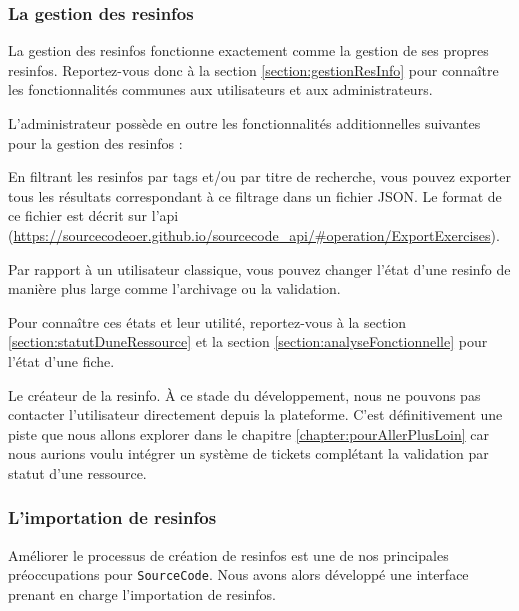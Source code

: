 \subsubsection{La gestion des \glspl{resinfo}}
\label{section:resInfoAdmin}

La gestion des \glspl{resinfo} fonctionne exactement comme la gestion de ses propres \glspl{resinfo}. Reportez-vous donc à la section \ref{section:gestionResInfo} pour connaître les fonctionnalités communes aux utilisateurs et aux administrateurs.

L'administrateur possède en outre les fonctionnalités additionnelles suivantes pour la gestion des \glspl{resinfo} :

 
En filtrant les \glspl{resinfo} par \glspl{tag} et/ou par titre de recherche, vous pouvez exporter tous les résultats correspondant à ce filtrage dans un fichier JSON. Le format de ce fichier est décrit sur l'api (\url{https://sourcecodeoer.github.io/sourcecode_api/#operation/ExportExercises}).


Par rapport à un utilisateur classique, vous pouvez changer l'état d'une \gls{resinfo} de manière plus large comme l'archivage ou la validation.

Pour connaître ces états et leur utilité, reportez-vous à la section \ref{section:statutDuneRessource} et la section \ref{section:analyseFonctionnelle} pour l'état d'une \gls{fiche}.


Le créateur de la \gls{resinfo}. À ce stade du développement, nous ne pouvons pas contacter l'utilisateur directement depuis la plateforme. C'est définitivement une piste que nous allons explorer dans le chapitre \ref{chapter:pourAllerPlusLoin} car nous aurions voulu intégrer un système de tickets complétant la validation par statut d'une ressource.\\

\subsubsection{L'importation de \glspl{resinfo}}

Améliorer le processus de création de \glspl{resinfo} est une de nos principales préoccupations pour \texttt{SourceCode}. Nous avons alors développé une interface prenant en charge l'importation de \glspl{resinfo}.

